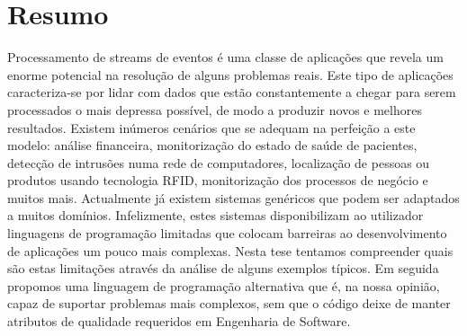 \documentclass[a4,11pt]{article}
\begin{document}
\addtolength{\parskip}{\baselineskip}

\section*{Resumo}

Processamento de streams de eventos \'{e} uma classe de
aplica\c{c}\~{o}es que revela um enorme potencial na resolu\c{c}\~{a}o
de alguns problemas reais. Este tipo de aplica\c{c}\~{o}es
caracteriza-se por lidar com dados que est\~{a}o constantemente a
chegar para serem processados o mais depressa poss\'{i}vel, de modo a
produzir novos e melhores resultados. Existem in\'{u}meros
cen\'{a}rios que se adequam na perfei\c{c}\~{a}o a este modelo:
an\'{a}lise financeira, monitoriza\c{c}\~{a}o do estado de sa\'{u}de
de pacientes, detec\c{c}\~{a}o de intrus\~{o}es numa rede de
computadores, localiza\c{c}\~{a}o de pessoas ou produtos usando
tecnologia RFID, monitoriza\c{c}\~{a}o dos processos de neg\'{o}cio e
muitos mais. Actualmente j\'{a} existem sistemas gen\'{e}ricos que
podem ser adaptados a muitos dom\'{i}nios. Infelizmente, estes
sistemas disponibilizam ao utilizador linguagens de
programa\c{c}\~{a}o limitadas que colocam barreiras ao desenvolvimento
de aplica\c{c}\~{o}es um pouco mais complexas. Nesta tese tentamos
compreender quais s\~{a}o estas limita\c{c}\~{o}es atrav\'{e}s da
an\'{a}lise de alguns exemplos t\'{i}picos. Em seguida propomos uma
linguagem de programa\c{c}\~{a}o alternativa que \'{e}, na nossa
opini\~{a}o, capaz de suportar problemas mais complexos, sem que o
c\'{o}digo deixe de manter atributos de qualidade requeridos em
Engenharia de Software.


\end{document}
